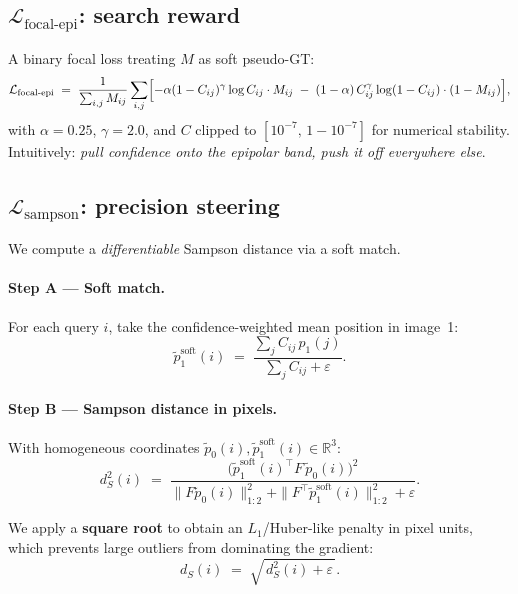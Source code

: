 \documentclass[11pt]{article}
\begin{document}
\subsection{$\mathcal{L}_{\text{focal-epi}}$: search reward}

A binary focal loss treating $M$ as soft pseudo-GT:
\begin{equation}
\mathcal{L}_{\text{focal-epi}}
\;=\;
\frac{1}{\sum_{i,j} M_{ij}}
\sum_{i,j}
\Bigl[
-\alpha (1 - C_{ij})^\gamma \log C_{ij}\cdot M_{ij}
\;-\;
(1 - \alpha)\,C_{ij}^{\gamma}\log(1 - C_{ij})\cdot(1 - M_{ij})
\Bigr],
\end{equation}
with $\alpha = 0.25$, $\gamma = 2.0$, and $C$ clipped to
$[10^{-7},\, 1 - 10^{-7}]$ for numerical stability.
Intuitively: \emph{pull confidence onto the epipolar band, push it off
everywhere else}.

\subsection{$\mathcal{L}_{\text{sampson}}$: precision steering}

We compute a \emph{differentiable} Sampson distance via a soft match.

\paragraph{Step A --- Soft match.} For each query $i$, take the
confidence-weighted mean position in image~1:
\begin{equation}
\tilde p_1^{\text{soft}}(i)
\;=\;
\frac{\sum_j C_{ij}\, p_1(j)}{\sum_j C_{ij} + \varepsilon}.
\end{equation}

\paragraph{Step B --- Sampson distance in pixels.} With homogeneous
coordinates $\tilde p_0(i), \tilde p_1^{\text{soft}}(i) \in \mathbb{R}^3$:
\begin{equation}
d_S^2(i)
\;=\;
\frac{\bigl(\tilde p_1^{\text{soft}}(i)^{\top} F\,\tilde p_0(i)\bigr)^2}
     {\|F \tilde p_0(i)\|_{1:2}^2 + \|F^{\top}\tilde p_1^{\text{soft}}(i)\|_{1:2}^2 + \varepsilon}.
\end{equation}

We apply a \textbf{square root} to obtain an $L_1$/Huber-like penalty in
pixel units, which prevents large outliers from dominating the
gradient:
\begin{equation}
d_S(i) \;=\; \sqrt{\,d_S^2(i) + \varepsilon\,}.
\end{equation}
\end{document}
